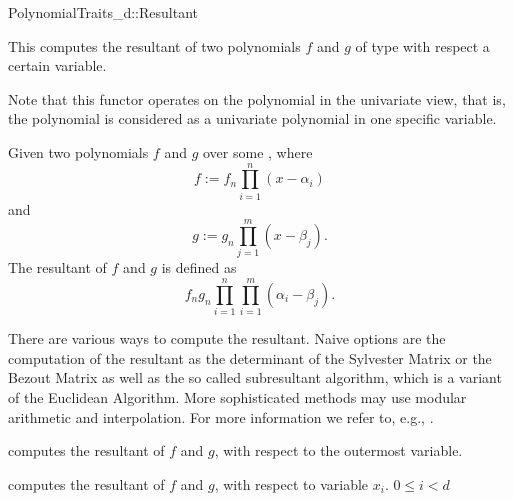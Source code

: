 \begin{ccRefConcept}{PolynomialTraits_d::Resultant}
\ccDefinition

This  computes the resultant of two polynomials 
$f$ and $g$ of type  with respect a 
certain variable.
 
Note that this functor operates on the polynomial in the univariate view, 
that is, the polynomial is considered as a univariate polynomial in one 
specific variable. 

Given two polynomials $f$ and $g$ over some , where 
\[f := f_n \prod_{i=1}^{n}{(x-\alpha_i)}\] 
and 
\[g :=  g_n \prod_{j=1}^{m}{(x-\beta_j)}.\] 
The resultant of $f$ and $g$ is defined as 
\[f_n g_n \prod_{i=1}^{n}\prod_{i=1}^{m}{(\alpha_i-\beta_j)}.\] 

There are various ways to compute the resultant. 
Naive options are the computation of the 
resultant as the determinant of the Sylvester Matrix or the Bezout 
Matrix as well as the so called subresultant algorithm, 
which is a variant of the Euclidean Algorithm. 
More sophisticated methods may use modular arithmetic and interpolation. 
For more information we refer to, e.g., \cite{gg-mca-99}. 

\ccRefines 
{}

\ccTypes
{}
\ccGlue
{}
\ccGlue
{}

\ccOperations
{}
         { computes the resultant of $f$ and $g$, 
           with respect to the outermost variable.}

         { computes the resultant of $f$ and $g$,
           with respect to variable $x_i$. 
           \ccPrecond $0 \leq i  < d$ 
         }


\ccSeeAlso

\\
\\

\end{ccRefConcept}
